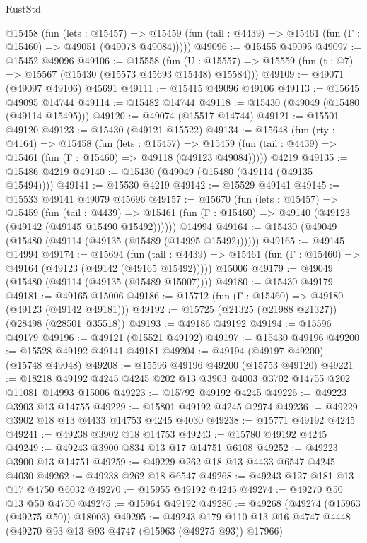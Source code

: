 \begin{lexlean}{RustStd}
\begin{coremodule}
    @15458
      (fun (lets : @15457) =>
      @15459 (fun (tail : @4439) => @15461 (fun (Γ : @15460) => @49051 (@49078 @49084)))))
@49096 := @15455 @49095
@49097 := @15452 @49096
@49106 := @15558
    (fun (U : @15557) => @15559 (fun (t : @7) => @15567 (@15430 (@15573 @45693 @15448) @15584)))
@49109 := @49071 (@49097 @49106) @45691
@49111 := @15415 @49096 @49106
@49113 := @15645 @49095 @14744
@49114 := @15482 @14744
@49118 := @15430 (@49049 (@15480 (@49114 @15495)))
@49120 := @49074 (@15517 @14744)
@49121 := @15501 @49120
@49123 := @15430 (@49121 @15522)
@49134 := @15648
    (fun (rty : @4164) =>
    @15458
      (fun (lets : @15457) =>
      @15459 (fun (tail : @4439) => @15461 (fun (Γ : @15460) => @49118 (@49123 @49084)))))
    @4219
@49135 := @15486 @4219
@49140 := @15430 (@49049 (@15480 (@49114 (@49135 @15494))))
@49141 := @15530 @4219
@49142 := @15529 @49141
@49145 := @15533 @49141 @49079 @45696
@49157 := @15670
    (fun (lets : @15457) =>
    @15459
      (fun (tail : @4439) =>
      @15461 (fun (Γ : @15460) => @49140 (@49123 (@49142 (@49145 @15490 @15492))))))
    @14994
@49164 := @15430 (@49049 (@15480 (@49114 (@49135 (@15489 (@14995 @15492))))))
@49165 := @49145 @14994
@49174 := @15694
    (fun (tail : @4439) => @15461 (fun (Γ : @15460) => @49164 (@49123 (@49142 (@49165 @15492)))))
    @15006
@49179 := @49049 (@15480 (@49114 (@49135 (@15489 @15007))))
@49180 := @15430 @49179
@49181 := @49165 @15006
@49186 := @15712 (fun (Γ : @15460) => @49180 (@49123 (@49142 @49181)))
@49192 := @15725 (@21325 (@21988 @21327)) (@28498 (@28501 @35518))
@49193 := @49186 @49192
@49194 := @15596 @49179
@49196 := @49121 (@15521 @49192)
@49197 := @15430 @49196
@49200 := @15528 @49192 @49141 @49181
@49204 := @49194 (@49197 @49200) (@15748 @49048)
@49208 := @15596 @49196 @49200 (@15753 @49120)
@49221 := @18218 @49192 @4245 @4245 @202 @13 @3903 @4003 @3702 @14755 @202 @11081 @14993 @15006
@49223 := @15792 @49192 @4245
@49226 := @49223 @3903 @13 @14755
@49229 := @15801 @49192 @4245 @2974
@49236 := @49229 @3902 @18 @13 @4433 @14753 @4245 @4030
@49238 := @15771 @49192 @4245
@49241 := @49238 @3902 @18 @14753
@49243 := @15780 @49192 @4245
@49249 := @49243 @3900 @834 @13 @17 @14751 @6108
@49252 := @49223 @3900 @13 @14751
@49259 := @49229 @262 @18 @13 @4433 @6547 @4245 @4030
@49262 := @49238 @262 @18 @6547
@49268 := @49243 @127 @181 @13 @17 @4750 @6032
@49270 := @15955 @49192 @4245
@49274 := @49270 @50 @13 @50 @4750
@49275 := @15964 @49192
@49280 := @49268 (@49274 (@15963 (@49275 @50)) @18003)
@49295 := @49243
    @179
    @110
    @13
    @16
    @4747
    @4448
    (@49270 @93 @13 @93 @4747 (@15963 (@49275 @93)) @17966)

\end{coremodule}
\end{lexlean}
